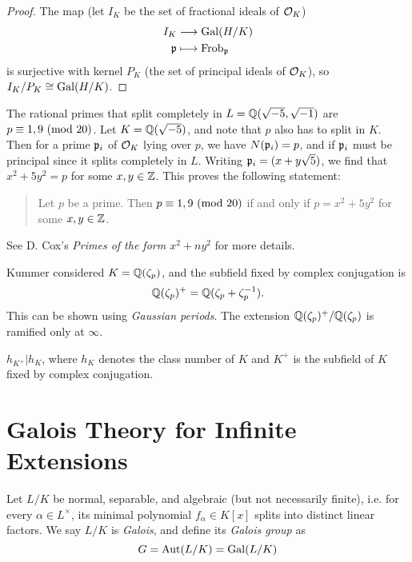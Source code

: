 \begin{proof}
  The map (let $I_K$ be the set of fractional
  ideals of $\mathcal{O}_K$)
  \begin{align*}
    I_K &\longrightarrow \operatorname{Gal}(H / K) \\
    \mathfrak{p} &\longmapsto \operatorname{Frob}_{\mathfrak{p}}
  \end{align*}
  is surjective with kernel $P_K$ (the set of
  principal ideals of $\mathcal{O}_K$), so
  $I_K / P_K \cong \operatorname{Gal}(H / K)$.
\end{proof}

\begin{example}
  The rational primes that split completely in
  $L = \mathbb{Q}(\sqrt{-5}, \sqrt{-1})$ are
  $p \equiv 1, 9 \ (\mathrm{mod}\ 20)$. Let
  $K = \mathbb{Q}(\sqrt{-5})$, and note that $p$
  also has to split in $K$. Then for a prime
  $\mathfrak{p}_i$ of $\mathcal{O}_K$ lying over $p$, we have
  $N(\mathfrak{p}_i) = p$, and if $\mathfrak{p}_i$ must be
  principal since it splits completely in
  $L$. Writing $\mathfrak{p}_i = (x + y \sqrt{5})$,
  we find that $x^2 + 5y^2 = p$ for some $x, y \in \mathbb{Z}$.
  This proves the following statement:
  \begin{quote}
    Let $p$ be a prime. Then
    $p \equiv 1, 9 \ (\mathrm{mod}\ 20)$ if and only if
    $p = x^2 + 5y^2$ for some $x, y \in \mathbb{Z}$.
  \end{quote}
  See D. Cox's \emph{Primes of the form $x^2 + ny^2$} for
  more details.
\end{example}

\begin{remark}
  Kummer considered $K = \mathbb{Q}(\zeta_p)$, and
  the subfield fixed by complex conjugation is
  \[
    \mathbb{Q}(\zeta_p)^+ = \mathbb{Q}(\zeta_p + \zeta_p^{-1}).
  \]
  This can be shown using \emph{Gaussian periods}.
  The extension $\mathbb{Q}(\zeta_p)^+ / \mathbb{Q}(\zeta_p)$ is
  ramified only at $\infty$.
\end{remark}

\begin{theorem}[Kummer]
  $h_{K^+} | h_K$, where $h_K$ denotes the
  class number of $K$ and $K^+$ is the
  subfield of $K$ fixed by complex
  conjugation.
\end{theorem}

\section{Galois Theory for Infinite Extensions}

\begin{definition}
  Let $L / K$ be normal, separable, and
  algebraic (but not necessarily finite), i.e.
  for every $\alpha \in L^\times$, its
  minimal polynomial $f_\alpha \in K[x]$
  splits into distinct linear
  factors. We say $L / K$ is \emph{Galois}, and
  define its \emph{Galois group} as
  \[
    G = \operatorname{Aut}(L / K) = \operatorname{Gal}(L / K)
  \]
\end{definition}

